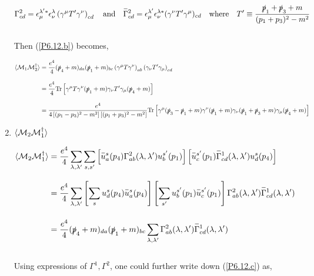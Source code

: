 \begin{solution}
\begin{enumerate}[label=(\alph*)]
    \begin{align}
        \Gamma^2_{cd} = \epsilon^{\lambda'\ast}_\mu \epsilon^{\lambda}_{\nu} \left( \gamma^\mu T' \gamma^\nu \right)_{cd} \andtxt \overbar{\Gamma}^2_{cd} = \epsilon^{\lambda'}_\mu \epsilon^{\lambda\ast}_{\nu} ( \gamma^{\nu} T' \gamma^{\mu} )_{cd} \quad \text{where} \quad T' \equiv \frac{\pslash_1+\pslash_3+m}{(p_1+p_3)^2 - m^2}
    \end{align}\\
    Then (\ref{P6.12.b}) becomes,

    \begin{align}
        \langle \mathcal{M}_1\mathcal{M}_2^\dagger \rangle &= \frac{e^4}{4} (\slashed{p}_4+m)_{da}  (\slashed{p}_1+m)_{bc} \left( \gamma^\mu T \gamma^\nu \right)_{ab} \left( \gamma_\nu T' \gamma_\mu \right)_{cd} \nonumber \\[0.12in]
        &=  \frac{e^4}{4} \text{Tr}\left[\gamma^\mu T \gamma^\nu (\slashed{p}_1+m) \gamma_\nu T' \gamma_\mu (\slashed{p}_4+m)\right] \nonumber \\[0.12in]
        &=  \frac{e^4}{4\left[(p_1-p_3)^2-m^2\right]\left[(p_1+p_3)^2-m^2\right]} \text{Tr}\left[\gamma^\mu (\slashed{p}_3-\slashed{p}_1+m) \gamma^\nu (\slashed{p}_1+m) \gamma_\nu (\slashed{p}_1+\slashed{p}_3+m) \gamma_\mu (\slashed{p}_4+m)\right] \label{P6.12.b.1}
    \end{align}

    \item $\langle \mathcal{M}_2\mathcal{M}_1^\dagger \rangle $
    
    \begin{align}
        \expval{\mathcal{M}_2\mathcal{M}_1^\dagger} &= \frac{e^4}{4}  \sum_{\lambda,\lambda'} \sum_{s,s'} \left[  \overbar{u}^s_a(p_4) \Gamma^2_{ab}(\lambda,\lambda')u^{s'}_b(p_1)\right] \left[  \overbar{u}^{s'}_c(p_1)\overbar{\Gamma}^1_{cd}(\lambda,\lambda')u^{s}_d(p_4)\right] \nonumber \\[0.12in]
        &=  \frac{e^4}{4} \sum_{\lambda,\lambda'} \left[ \sum_{s} u^s_d(p_4) \overbar{u}^s_a(p_4) \right]  \left[ \sum_{s'}u^{s'}_b(p_1)   \overbar{u}^{s'}_c(p_1) \right] \Gamma^2_{ab}(\lambda,\lambda') \overbar{\Gamma}^1_{cd}(\lambda,\lambda') \nonumber \\[0.15in]
        &= \frac{e^4}{4}  (\pslash_4+m)_{da}  (\pslash_1+m)_{bc}  \sum_{\lambda,\lambda'} \Gamma^2_{ab}(\lambda,\lambda') \overbar{\Gamma}^1_{cd}(\lambda,\lambda')  \label{P6.12.c}
    \end{align}\\
    Using expressions of $\Gamma^1,\Gamma^2$, one could further write down (\ref{P6.12.c}) as, 


\end{enumerate}
\end{solution}
